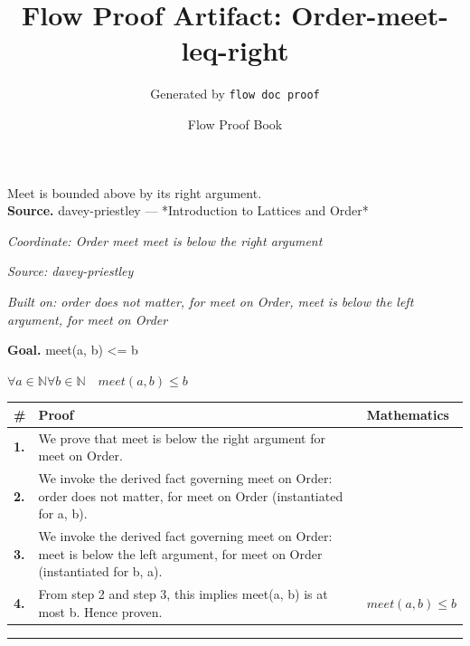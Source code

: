 \documentclass[11pt]{article}
\title{Flow Proof Artifact: Order-meet-leq-right}
\author{Generated by \texttt{flow doc proof}}
\date{Flow Proof Book}
\theoremstyle{definition}
\begin{document}
\maketitle
Meet is bounded above by its right argument.\\[0.5em]
\textbf{Source.} davey-priestley — *Introduction to Lattices and Order*\\[0.5em]
\bigskip
{}\par
\smallskip\noindent\textit{Coordinate: Order \cdot meet \cdot meet is below the right argument}\par
\smallskip\noindent\textit{Source: davey-priestley}\par
\smallskip\noindent\textit{Built on: order does not matter, for meet on Order, meet is below the left argument, for meet on Order}\par
\medskip
\noindent\textbf{Goal.} meet(a, b) <= b\par
\noindent$\displaystyle \forall a \in \mathbb{N} \forall b \in \mathbb{N}\quad meet(a, b) \le b$\par
\medskip
\noindent
\begin{tabular}{@{} >{\raggedright\arraybackslash}p{} >{\raggedright\arraybackslash}p{} >{\raggedleft\arraybackslash}p{} @{}}
\textbf{\#} & \textbf{Proof} & \textbf{Mathematics} \\
\midrule
\textbf{1.} & We prove that meet is below the right argument for meet on Order. & \\[0.45em]
\textbf{2.} & We invoke the derived fact governing meet on Order: order does not matter, for meet on Order (instantiated for a, b). & \\[0.45em]
\textbf{3.} & We invoke the derived fact governing meet on Order: meet is below the left argument, for meet on Order (instantiated for b, a). & \\[0.45em]
\textbf{4.} & From step 2 and step 3, this implies meet(a, b) is at most b. Hence proven. & $\displaystyle meet(a, b) \le b$ \\[0.45em]
\bottomrule
\end{tabular}
\label{thm:Order-meet-meet_is_below_the_right_argument}
\par\medskip\hrule
\end{document}
